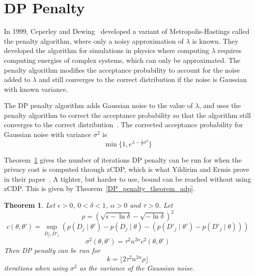 \documentclass[english,twoside,openright]{HYgraduMLDS}
\newtheorem{theorem}{Theorem}
\begin{document}
\section{DP Penalty}

In 1999, Ceperley and Dewing~\cite{CeD99} developed a variant of 
Metropolis-Hastings called the penalty 
algorithm, where only a noisy approximation of \(\lambda\) is known. They 
developed the algorithm for simulations in physics where computing \(\lambda\)
requires computing energies of complex systems, which can only be approximated.
The penalty algorithm modifies the acceptance probability to account for the 
noise added to \(\lambda\) and still converges to the correct distribution if 
the noise is Gaussian with known variance.

The DP penalty algorithm adds Gaussian noise to the value of \(\lambda\), and 
uses the penalty algorithm to correct the acceptance probability so that 
the algorithm still converges to the correct distribution~\cite{YildirimE19}.
The corrected acceptance probability for Gaussian noise with variance 
\(\sigma^2\) is 
\[
    \min\{1, e^{\lambda - \frac{1}{2}\sigma^2}\}
\]

Theorem~\ref{DP_penalty_theorem_zcdp} gives the number of iterations DP penalty 
can be run for when the privacy cost is computed through zCDP, which is 
what Yildirim and Ermis prove in their paper~\cite{YildirimE19}. A tighter, but 
harder to use, bound can be reached without using zCDP. This is given by 
Theorem~\ref{DP_penalty_theorem_adp}.

\begin{theorem}\label{DP_penalty_theorem_zcdp}
    Let \(\epsilon > 0\), \(0 < \delta < 1\), \(\alpha > 0\) and \(\tau > 0\).
    Let
    \[
        \rho = (\sqrt{\epsilon - \ln \delta} - \sqrt{-\ln \delta})^2
    \]
    \[
        c(\theta, \theta') = \sup_{D_j, D'_j} (p(D_j\mid \theta') - p(D_j\mid \theta) 
        - (p(D'_j\mid \theta') - p(D'_j\mid \theta)))
    \]
    \[
        \sigma^2(\theta, \theta') = \tau^2 n^{2\alpha}c^2(\theta, \theta')
    \]
    Then DP penalty can be run for 
    \[
        k = \lfloor 2\tau^2 n^{2\alpha} \rho\rfloor
    \]
    iterations when using \(\sigma^2\) as the variance of the Gaussian noise.
\end{theorem}
\end{document}

